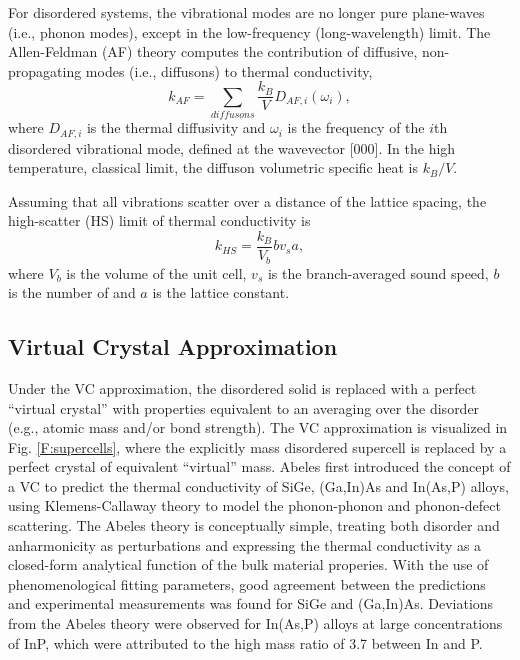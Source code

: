 \documentclass[aps,prb,onecolumn,preprint,superscriptaddress,amsmath,amssymb,floatfix]{revtex4}
\begin{document}
For disordered systems, the vibrational modes are no 
longer pure plane-waves (i.e., phonon modes), except in the low-frequency 
(long-wavelength) limit. The Allen-Feldman (AF) theory computes 
the contribution of diffusive, non-propagating modes (i.e., diffusons) 
to thermal conductivity,\cite{allen_thermal_1993} 
\begin{equation}\label{EQ:M:k_AF}
k_{AF} = \sum_{diffusons} \frac{k_{B}}{V} D_{AF,i}(\omega_i),
\end{equation}
where $D_{AF,i}$ is the thermal diffusivity and $\omega_i$ is the 
frequency of the $i$th  
disordered vibrational mode, defined at the wavevector [000]. In the 
high temperature, classical limit, the diffuson volumetric specific 
heat is $k_{B}/V$.

Assuming that all 
vibrations scatter over a distance of the lattice spacing, 
the high-scatter (HS) limit of thermal conductivity is
\begin{equation}\label{EQ:M:k_AF,HS}
k_{HS} = \frac{k_{B}}{V_b}b v_s a,
\end{equation}
where $V_b$ is the volume of the unit cell, $v_s$ is the 
branch-averaged sound speed, $b$ is the number of 
and $a$ is the lattice constant.
\cite{cahill_lattice_1988} 


\subsection{\label{S:Virtual Crystal}Virtual Crystal Approximation}

Under the VC approximation, the disordered 
solid is replaced with a perfect “virtual crystal” with properties 
equivalent to an averaging over the disorder 
(e.g., atomic mass and/or bond strength).\cite{abeles_lattice_1963}
The VC approximation is visualized in Fig. \ref{F:supercells}, where 
the explicitly mass disordered supercell is replaced by a perfect 
crystal of equivalent ``virtual'' mass. 
Abeles first introduced the concept of a VC to predict the
thermal conductivity of SiGe, (Ga,In)As and In(As,P) alloys, using  
Klemens-Callaway theory to model the phonon-phonon and phonon-defect 
scattering.
\cite{klemens_scattering_1955,klemens_thermal_1957,callaway_model_1959} 
The Abeles theory is conceptually simple,  
treating both
disorder and anharmonicity as perturbations and expressing the thermal 
conductivity as a closed-form analytical function of the bulk material 
properies.\cite{abeles_lattice_1963} With the use of phenomenological  
fitting parameters, good agreement between the predictions and 
experimental measurements 
was found for SiGe and (Ga,In)As. Deviations from the Abeles theory 
were observed for In(As,P) alloys at large concentrations of InP, 
which were attributed to the high mass ratio of 3.7 between In and P.
\cite{abeles_lattice_1963}
\end{document}
